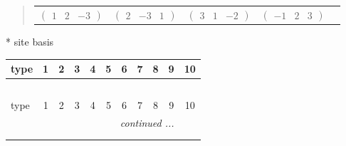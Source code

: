 \documentclass[fleqn,9pt,landscape]{jsarticle}
\begin{document}
\begin{quote}
\begin{tabular}{ccccc}
$ \begin{pmatrix} 1 & 2 & -3 \end{pmatrix} $ & $ \begin{pmatrix} 2 & -3 & 1 \end{pmatrix} $ & $ \begin{pmatrix} 3 & 1 & -2 \end{pmatrix} $ & $ \begin{pmatrix} -1 & 2 & 3 \end{pmatrix} $ & $  $
\end{tabular}
\end{quote}
* site basis
\begin{center}
\renewcommand{\arraystretch}{1.3}
\begin{longtable}{lcccccccccc}
 \hline \hline
type & 1 & 2 & 3 & 4 & 5 & 6 & 7 & 8 & 9 & 10 \\ \hline \endfirsthead

\multicolumn{10}{l}{\tablename\ \thetable{}} \\
 \hline \hline
type & 1 & 2 & 3 & 4 & 5 & 6 & 7 & 8 & 9 & 10 \\ \hline \endhead

 \hline \hline
\multicolumn{10}{r}{\footnotesize\it continued ...} \\ \endfoot

 \hline \hline
\multicolumn{10}{r}{} \\ \endlastfoot


\end{longtable}
\end{center}
\end{document}
